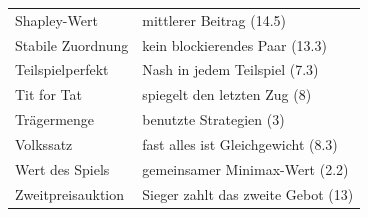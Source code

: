 \begin{merksatz}
\begin{center}
{\begin{longtable}{@{}P{3.6cm}P{5.0cm}@{}}
Shapley-Wert & mittlerer Beitrag (14.5)\\
Stabile Zuordnung & kein blockierendes Paar (13.3)\\
Teilspielperfekt & Nash in jedem Teilspiel (7.3)\\
Tit for Tat & spiegelt den letzten Zug (8)\\
Trägermenge & benutzte Strategien (3)\\
Volkssatz & fast alles ist Gleichgewicht (8.3)\\
Wert des Spiels & gemeinsamer Minimax-Wert (2.2)\\
Zweitpreisauktion & Sieger zahlt das zweite Gebot (13)\\
\bottomrule
\end{longtable}}
\end{center}
\end{merksatz}

